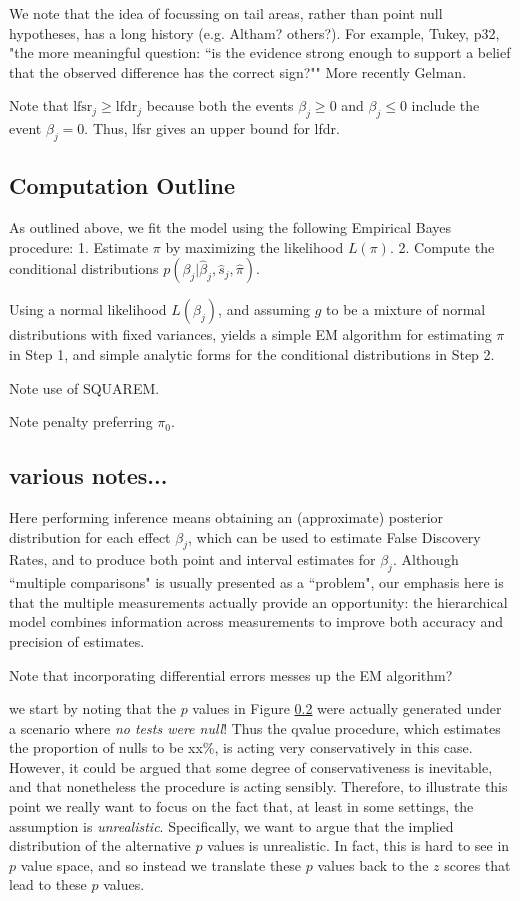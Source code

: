 \documentclass[11pt]{article}
\def\bhat{\hat{\beta}}
\def\shat{\hat{s}}
\begin{document}
We note that the idea of focussing on tail areas, rather than point null hypotheses,
has a long history (e.g. Altham? others?). For example, 
Tukey, p32, "the more meaningful question: ``is the evidence strong enough to support a belief that the observed difference has the correct sign?""
More recently Gelman.


Note that $\text{lfsr}_j \geq \text{lfdr}_j$ 
because both the events $\beta_j \geq 0$
and $\beta_j \leq 0$ include the event $\beta_j=0$.
Thus, lfsr gives an upper bound for lfdr.






\subsection{Computation Outline}

As outlined above, we fit the model using the following Empirical Bayes procedure:
1. Estimate $\pi$ by maximizing the likelihood $L(\pi)$.
2. Compute the conditional distributions $p(\beta_j | \bhat_j, \shat_j, \hat\pi)$.

Using a normal likelihood $L(\beta_j)$, and assuming
$g$ to be a mixture of normal distributions with fixed variances, 
yields a simple EM algorithm
for estimating $\pi$ in Step 1, and simple analytic forms for the conditional
distributions in Step 2.

Note use of SQUAREM.

Note penalty preferring $\pi_0$.

\subsection{various notes...}

Here performing inference means obtaining an (approximate) posterior distribution for each effect $\beta_j$,
which can be used to estimate False Discovery Rates, and to produce both point and interval estimates for $\beta_j$.
 Although ``multiple comparisons" is usually presented as a ``problem", our emphasis here is that the multiple measurements
 actually provide an opportunity: the hierarchical model combines information across measurements to improve both accuracy and precision of estimates. 
 
 
Note that incorporating differential errors messes up the EM algorithm?

we start by noting that the $p$ values in Figure \ref{} were actually generated under a scenario where
{\it no tests were null}! Thus the qvalue procedure, which estimates the proportion of nulls to be xx\%, is acting very conservatively in this case.
However, it could be argued that some degree of conservativeness is inevitable, and that nonetheless the procedure is acting sensibly.
Therefore, to illustrate this point we really want to focus on the fact that, at least in some settings, the assumption is {\it unrealistic}.
Specifically, we want to argue that the implied distribution of the alternative $p$ values is unrealistic. In fact, this is hard to see in $p$ value space,
and so instead we translate these $p$ values back to the $z$ scores that lead to these $p$ values.
\end{document}
